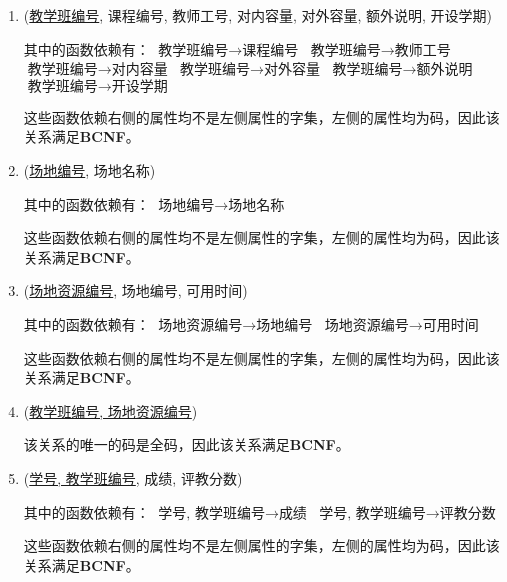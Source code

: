 \begin{enumerate}
    \item (\uline{教学班编号}, 课程编号, 教师工号, 对内容量, 对外容量, 额外说明, 开设学期) \par
    其中的函数依赖有： \newline
    $\text{教学班编号} \rightarrow \text{课程编号}$ \newline
    $\text{教学班编号} \rightarrow \text{教师工号}$ \newline
    $\text{教学班编号} \rightarrow \text{对内容量}$ \newline
    $\text{教学班编号} \rightarrow \text{对外容量}$ \newline
    $\text{教学班编号} \rightarrow \text{额外说明}$ \newline
    $\text{教学班编号} \rightarrow \text{开设学期}$ \par
    这些函数依赖右侧的属性均不是左侧属性的字集，左侧的属性均为码，因此该关系满足\textbf{BCNF}。
    
    \item (\uline{场地编号}, 场地名称) \par
    其中的函数依赖有： \newline
    $\text{场地编号} \rightarrow \text{场地名称}$ \par
    这些函数依赖右侧的属性均不是左侧属性的字集，左侧的属性均为码，因此该关系满足\textbf{BCNF}。
    
    \item (\uline{场地资源编号}, 场地编号, 可用时间) \par
    其中的函数依赖有： \newline
    $\text{场地资源编号} \rightarrow \text{场地编号}$ \newline
    $\text{场地资源编号} \rightarrow \text{可用时间}$ \par
    这些函数依赖右侧的属性均不是左侧属性的字集，左侧的属性均为码，因此该关系满足\textbf{BCNF}。
    
    \item (\uline{教学班编号, 场地资源编号}) \par
    该关系的唯一的码是全码，因此该关系满足\textbf{BCNF}。
    
    \item (\uline{学号, 教学班编号}, 成绩, 评教分数) \par
    其中的函数依赖有： \newline
    $\text{学号, 教学班编号} \rightarrow \text{成绩}$ \newline
    $\text{学号, 教学班编号} \rightarrow \text{评教分数}$ \par
    这些函数依赖右侧的属性均不是左侧属性的字集，左侧的属性均为码，因此该关系满足\textbf{BCNF}。
    

\end{enumerate}
